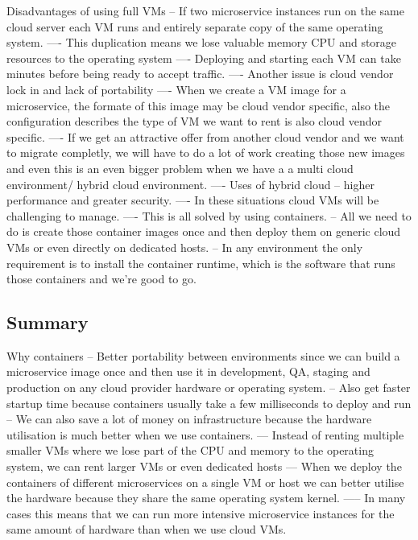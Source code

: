 \documentclass[a4paper, 11pt]{book}
\begin{document}
{    Disadvantages of using full VMs
    -- If two microservice instances run on the same cloud server each VM runs and entirely separate copy of the same operating system.
    ---- This duplication means we lose valuable memory CPU and storage resources to the operating system
    ---- Deploying and starting each VM can take minutes before being ready to accept traffic.
    ---- Another issue is cloud vendor lock in and lack of portability
    ---- When we create a VM image for a microservice,  the formate of this image may be cloud vendor specific, also the configuration describes the type of VM we want to rent is also cloud vendor specific.
    ---- If we get an attractive offer from another cloud vendor and we want to migrate completly, we will have to do a lot of work creating those new images and even this is an even bigger problem when we have a a multi cloud environment/ hybrid cloud environment.
    ---- Uses of hybrid cloud -- higher performance and greater security.
    ---- In these situations cloud VMs will be challenging to manage.
    ---- This is all solved by using containers.
    -- All we need to do is create those container images once and then deploy them on generic cloud VMs or even directly on dedicated hosts.
    -- In any environment the only requirement is to install the container runtime, which is the software that runs those containers and we're good to go.

    \subsection{Summary}
    Why containers
    -- Better portability between environments since we can build a microservice image once and then use it in development, QA, staging and production on any cloud provider hardware or operating system.
    -- Also get faster startup time because containers usually take a few milliseconds to deploy and run
    -- We can also save a lot of money on infrastructure because the hardware utilisation is much better when we use containers.
    --- Instead of renting multiple smaller VMs where we lose part of the CPU and memory to the operating system, we can rent larger VMs or even dedicated hosts
    --- When we deploy the containers of different microservices on a single VM or host we can better utilise the hardware because they share the same operating system kernel.
    ----- In many cases this means that we can run more intensive microservice instances for the same amount of hardware than when we use cloud VMs.

}
\end{document}
